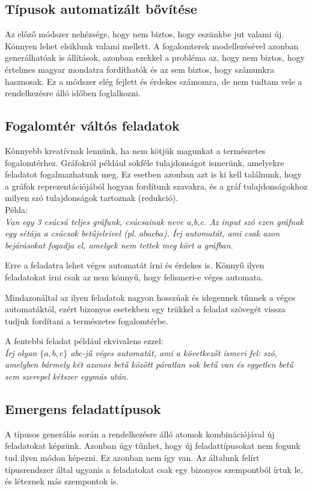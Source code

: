 \documentclass[12pt]{report}
\theoremstyle{definition}
\begin{document}
\subsection*{Típusok automatizált bővítése}
Az előző módszer nehézsége, hogy nem biztos, hogy eszünkbe jut valami új. Könnyen lehet elsiklunk valami mellett. A fogalomterek modellezésével azonban generálhatóak is állítások, azonban ezekkel a probléma az, hogy nem biztos, hogy értelmes magyar mondatra fordíthatók és az sem biztos, hogy számunkra hasznosak. Ez a módszer elég fejlett és érdekes számomra, de nem tudtam vele a rendelkezésre álló időben foglalkozni.

\subsection*{Fogalomtér váltós feladatok}
Könnyebb kreatívnak lennünk, ha nem kötjük magunkat a természetes fogalomtérhez. Gráfokról például sokféle tulajdonságot ismerünk, amelyekre feladatot fogalmazhatunk meg. Ez esetben azonban azt is ki kell találnunk, hogy a gráfok reprezentációjából hogyan fordítunk szavakra, és a gráf tulajdonságokhoz milyen szó tulajdonságok tartoznak (redukció).\\

Példa: \\
\textit{Van egy 3 csúcsú teljes gráfunk, csúcsainak neve a,b,c. Az input szó ezen gráfnak egy sétája a csúcsok betűjeleivel (pl. $abacba$). Írj automatát, ami csak azon bejárásokat fogadja el, amelyek nem tettek meg kört a gráfban.}

Erre a feladatra lehet véges automatát írni és érdekes is. Könnyű ilyen feladatokat írni csak az nem könnyű, hogy felismeri-e véges automata.

Mindazonáltal az ilyen feladatok nagyon hosszúak és idegennek tűnnek a véges automatáktól, ezért bizonyos esetekben egy trükkel a feladat szövegét vissza tudjuk fordítani a természetes fogalomtérbe.

A fentebbi feladat például ekvivalens ezzel:\\
\textit{Írj olyan $\{a,b,c\}$ abc-jű véges automatát, ami a következőt ismeri fel: szó, amelyben bármely két azonos betű között páratlan sok betű van és egyetlen betű sem szerepel kétszer egymás után.}

\subsection*{Emergens feladattípusok}
A típusos generálás során a rendelkezésre álló atomok kombinációjával új feladatokat képzünk. Azonban úgy tűnhet, hogy új feladattípusokat nem fogunk tud ilyen módon képezni. Ez azonban nem így van. Az általunk felírt típusrendszer által ugyanis a feladatokat csak egy bizonyos szempontból írtuk le, és léteznek más szempontok is.\\
\end{document}

